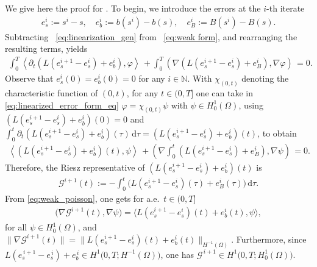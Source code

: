 \documentclass[review,11pt]{article}
\numberwithin{equation}{section}
\def \t  {\tau}
\def \p  {\partial}
\def \dd {\mathrm{d}}
\begin{document}
We give here the proof for . To begin, we introduce the errors at the $i$-th iterate
\begin{align}\label{eq:def_errors_a}
e_s^i := s^i - s, \quad e_b^i := b(s^i) - b(s), \quad e_B^i := B(s^i) - B(s).
\end{align}
Subtracting ~\eqref{eq:linearization_gen} from ~\eqref{eq:weak form}, and rearranging the resulting terms, yields
\begin{align}\label{eq:linearized_error_form_eq}
\int_0^T \left\langle \partial_t \left( L(e_s^{i+1} - e_s^i) + e_b^i \right), \varphi \right\rangle \,  
+ \int_0^T \left( \nabla \left( L\left(e_s^{i+1} - e_s^i\right) + e_B^i \right), \nabla \varphi \right) \, = 0.
\end{align}
Observe that $e^i_s(0) = e^i_b(0) = 0$ for any $i \in \mathbb{N}$. With $\chi_{(0,t)}$ denoting the characteristic function of $(0,t)$, for any $t \in (0,T]$ one can take in \eqref{eq:linearized_error_form_eq} $\varphi = \chi_{(0,t)}\psi$ with $\psi \in H^1_0(\Omega)$, using $(L(e^{i+1}_s -e^i_s) + e^i_b)(0)=0$ and $\int_0^t \p_t(L(e^{i+1}_s -e^i_s) + e^i_b)(\t)\,\dd \t= (L(e^{i+1}_s -e^i_s) + e^i_b)(t)$, to obtain
\begin{align}\label{eq:time-integrated-error}
\left\langle \left( L(e_s^{i+1} - e_s^i) + e_b^i \right)(t), \psi \right\rangle \,  
+ \left( \nabla \int_0^t \left( L\left(e_s^{i+1} - e_s^i\right) + e_B^i \right), \nabla \psi \right) \, = 0.
\end{align}
Therefore, the Riesz representative of $(L(e^{i+1}_s -e^i_s) + e^i_b)(t)$ is
\begin{align}\label{eq:green_def_new}
    \mathcal{G}^{i+1}(t) 
    := -\int_0^{t} 
    \bigl(L(e_s^{i+1} - e_s^i)(\tau) + e_B^i(\tau)\bigr)
    \,\dd\tau.
\end{align}
From \eqref{eq:weak_poisson}, one gets for a.e.\ $t\in (0,T]$
\begin{align}\label{eq:green_riesz}
\bigl(\nabla\mathcal{G}^{i+1}(t), \nabla\psi\bigr) = 
\bigl\langle L(e_s^{i+1}-e_s^i)(t)+e_b^i(t), \psi
\bigr\rangle, 
\end{align}
for all $ \psi\in H_0^1(\Omega)$, and $\|\nabla\mathcal{G}^{i+1}(t)\| =  \|L(e_s^{i+1}-e_s^i)(t)+e_b^i(t)\|_{H^{-1}(\Omega)}$. Furthermore, since $L(e_s^{\,i+1}-e_s^{\,i}) + e_b^{\,i}\in H^1\big(0,T;H^{-1}(\Omega)\big)$, one has $\mathcal{G}^{\,i+1} \in H^1\big(0,T;H_0^1(\Omega)\big)$.
\end{document}
